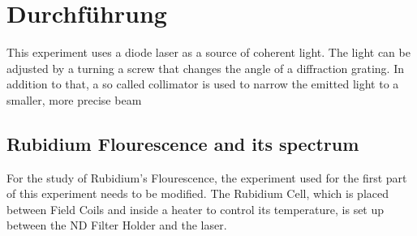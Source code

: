 \section{Durchführung}
\label{sec:Durchführung}

\label{sec:implementation}
This experiment uses a diode laser as a source of coherent light. The light can be adjusted by a turning a screw that changes the angle of a diffraction grating. 
In addition to that, a so called collimator is used to narrow the emitted light to a smaller, more precise beam 


\subsection{Rubidium Flourescence and its spectrum}
\label{sec:Rubi}
For the study of Rubidium's Flourescence, the experiment used for the first part of this experiment needs to be modified.
The Rubidium Cell, which is placed between Field Coils and inside a heater to control its temperature, is set up between the ND Filter Holder and the laser.